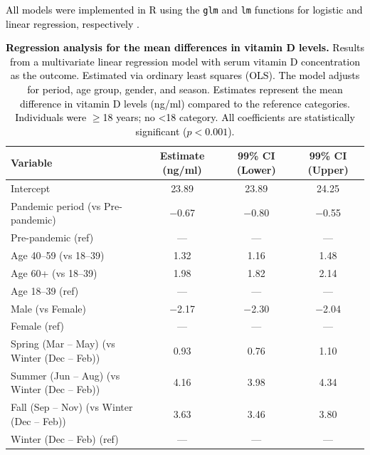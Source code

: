 \documentclass[12pt]{article}
\newcommand{\REV}[1]{\textcolor{black}{#1}}
\begin{document}
\begin{appendices}
\REV{All models were implemented in R using the \texttt{glm} and \texttt{lm} functions for logistic and linear regression, respectively \cite{RCoreTeam2023}.}



\newpage
\begin{table}[H]
\centering
{}
\caption[Regression analysis for the mean differences in vitamin D levels]{\REV{\textbf{Regression analysis for the mean differences in vitamin D levels.} Results from a multivariate linear regression model with serum vitamin D concentration as the outcome. Estimated via ordinary least squares (OLS). The model adjusts for period, age group, gender, and season. Estimates represent the mean difference in vitamin D levels (ng/ml) compared to the reference categories. Individuals were $\geq$18 years; no <18 category. All coefficients are statistically significant ($p < 0.001$).}}
\label{supptab:linear_regression}
\footnotesize
\begin{tabular}{|l|c|c|c|}
\hline
\rowcolor{orange!20} \textbf{Variable} & \textbf{Estimate (ng/ml)} & \textbf{99\% CI (Lower)} & \textbf{99\% CI (Upper)} \\ \hline
Intercept & 23.89 & 23.89 & 24.25 \\ \hline
Pandemic period (vs Pre-pandemic) & $-$0.67 & $-$0.80 & $-$0.55 \\ \hline
Pre-pandemic (ref) & --- & --- & --- \\ \hline
Age 40--59 (vs 18--39) & 1.32 & 1.16 & 1.48 \\ \hline
Age 60+ (vs 18--39) & 1.98 & 1.82 & 2.14 \\ \hline
Age 18--39 (ref) & --- & --- & --- \\ \hline
Male (vs Female) & $-$2.17 & $-$2.30 & $-$2.04 \\ \hline
Female (ref) & --- & --- & --- \\ \hline
Spring (Mar -- May) (vs Winter (Dec -- Feb)) & 0.93 & 0.76 & 1.10 \\ \hline
Summer (Jun -- Aug) (vs Winter (Dec -- Feb)) & 4.16 & 3.98 & 4.34 \\ \hline
Fall (Sep -- Nov) (vs Winter (Dec -- Feb)) & 3.63 & 3.46 & 3.80 \\ \hline
Winter (Dec -- Feb) (ref) & --- & --- & --- \\ \hline
\end{tabular}
\end{table}


\end{appendices}
\end{document}
